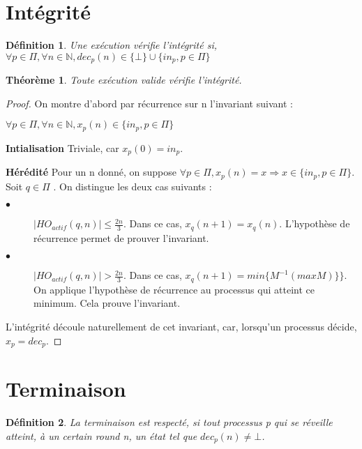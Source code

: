 \documentclass{article}
\newtheorem{theorem}{Théorème}
\newtheorem{definition}{Définition}
\begin{document}
\section{Intégrité}

\begin{definition}
	Une exécution vérifie l'intégrité si, $\forall p \in \Pi, \forall n \in \mathds{N}, dec_p(n) \in \{ \bot \} \cup \{ in_p, p \in \Pi \}$
\end{definition}

\begin{theorem}
	Toute exécution valide vérifie l'intégrité.
\end{theorem}
\begin{proof}
On montre d'abord par récurrence sur n l'invariant suivant : 

$ \forall p \in \Pi, \forall n \in \mathds{N}, x_p(n) \in \{ in_p, p \in \Pi \}$

\textbf{Intialisation}
Triviale, car $x_p(0) = in_p$. 

\textbf{Hérédité}
Pour un n donné, on suppose $\forall p \in \Pi, x_p(n) = x \Rightarrow x \in \{ in_p, p \in \Pi \}$.
Soit $q \in \Pi$ . On distingue les deux cas suivants :
\begin{description}

\item[$\bullet$] $|HO_{actif} (q, n) | \leq \frac{2n}{3}$. Dans ce cas, $x_q(n+1) = x_q(n)$. L'hypothèse de récurrence permet de prouver l'invariant.
\item[$\bullet$] $|HO_{actif} (q, n) | > \frac{2n}{3}$. Dans ce cas, $x_q(n+1) = min \{M^{-1} (max M)\}\}$. On applique l'hypothèse de récurrence au processus qui atteint ce minimum. Cela prouve l'invariant.

\end{description}

L'intégrité découle naturellement de cet invariant, car, lorsqu'un processus décide, $x_p = dec_p$.
\end{proof}

\section{Terminaison}

\begin{definition}
	La terminaison est respecté, si tout processus p qui se réveille atteint, à un certain round n, un état tel que $dec_p(n) \neq \bot$.
\end{definition}
\end{document}
